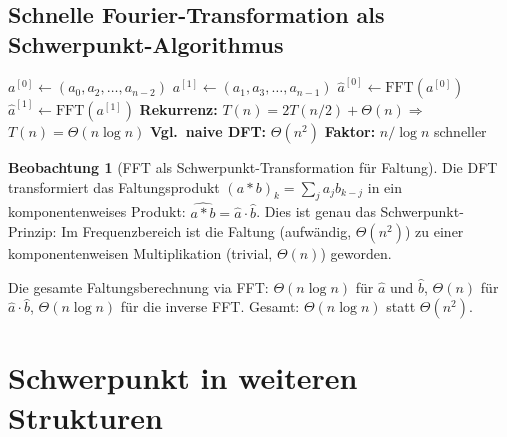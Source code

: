﻿\documentclass[a4paper,12pt]{report}
\theoremstyle{definition}
\newtheorem{beobachtung}{Beobachtung}
\begin{document}


\subsection*{Schnelle Fourier-Transformation als Schwerpunkt-Algorithmus}

\begin{algorithm}[H]
\DontPrintSemicolon
\caption{Schnelle Fourier-Transformation (Cooley-Tukey, $n = 2^k$)}\label{alg:fft}
$a^{[0]} \leftarrow (a_0, a_2, \ldots, a_{n-2})$ 
$a^{[1]} \leftarrow (a_1, a_3, \ldots, a_{n-1})$ 
$\hat{a}^{[0]} \leftarrow \mathrm{FFT}(a^{[0]})$\;
$\hat{a}^{[1]} \leftarrow \mathrm{FFT}(a^{[1]})$\;
\;
\BlankLine
\textbf{Rekurrenz:} $T(n) = 2T(n/2) + \Theta(n)$\quad $\Rightarrow$\quad $T(n) = \Theta(n\log n)$\;
\textbf{Vgl.\ naive DFT:} $\Theta(n^2)$ \quad \textbf{Faktor:} $n / \log n$ schneller
\end{algorithm}

\begin{beobachtung}[FFT als Schwerpunkt-Transformation für Faltung]
    Die DFT transformiert das Faltungsprodukt $(a * b)_k = \sum_j a_j b_{k-j}$
    in ein komponentenweises Produkt: $\widehat{a * b} = \hat{a} \cdot \hat{b}$.
    Dies ist genau das Schwerpunkt-Prinzip: Im Frequenzbereich ist die
    Faltung (aufwändig, $\Theta(n^2)$) zu einer komponentenweisen
    Multiplikation (trivial, $\Theta(n)$) geworden.

    Die gesamte Faltungsberechnung via FFT:
    $\Theta(n\log n)$ für $\hat{a}$ und $\hat{b}$, $\Theta(n)$ für $\hat{a}\cdot\hat{b}$,
    $\Theta(n\log n)$ für die inverse FFT. Gesamt: $\Theta(n\log n)$ statt $\Theta(n^2)$.
\end{beobachtung}

\section{Schwerpunkt in weiteren Strukturen}
\end{document}
